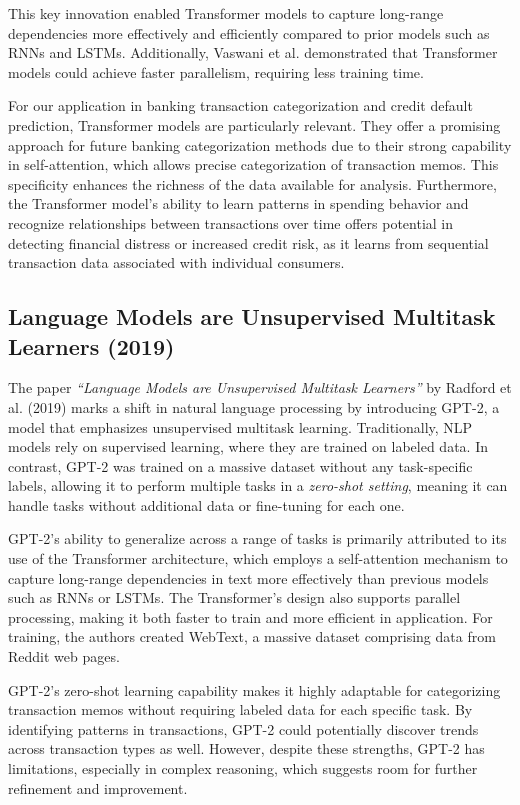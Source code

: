 \documentclass[12pt,letterpaper]{article}
\begin{document}
This key innovation enabled Transformer models to capture long-range dependencies more effectively and efficiently compared to prior models such as RNNs and LSTMs. Additionally, Vaswani et al. demonstrated that Transformer models could achieve faster parallelism, requiring less training time.

For our application in banking transaction categorization and credit default prediction, Transformer models are particularly relevant. They offer a promising approach for future banking categorization methods due to their strong capability in self-attention, which allows precise categorization of transaction memos. This specificity enhances the richness of the data available for analysis. Furthermore, the Transformer model's ability to learn patterns in spending behavior and recognize relationships between transactions over time offers potential in detecting financial distress or increased credit risk, as it learns from sequential transaction data associated with individual consumers.

\subsection{Language Models are Unsupervised Multitask Learners (2019)}
The paper \textit{“Language Models are Unsupervised Multitask Learners”} by Radford et al. (2019) marks a shift in natural language processing by introducing GPT-2, a model that emphasizes unsupervised multitask learning. Traditionally, NLP models rely on supervised learning, where they are trained on labeled data. In contrast, GPT-2 was trained on a massive dataset without any task-specific labels, allowing it to perform multiple tasks in a \textit{zero-shot setting}, meaning it can handle tasks without additional data or fine-tuning for each one.

GPT-2’s ability to generalize across a range of tasks is primarily attributed to its use of the Transformer architecture, which employs a self-attention mechanism to capture long-range dependencies in text more effectively than previous models such as RNNs or LSTMs. The Transformer’s design also supports parallel processing, making it both faster to train and more efficient in application. For training, the authors created WebText, a massive dataset comprising data from Reddit web pages.

GPT-2’s zero-shot learning capability makes it highly adaptable for categorizing transaction memos without requiring labeled data for each specific task. By identifying patterns in transactions, GPT-2 could potentially discover trends across transaction types as well. However, despite these strengths, GPT-2 has limitations, especially in complex reasoning, which suggests room for further refinement and improvement.
\end{document}
